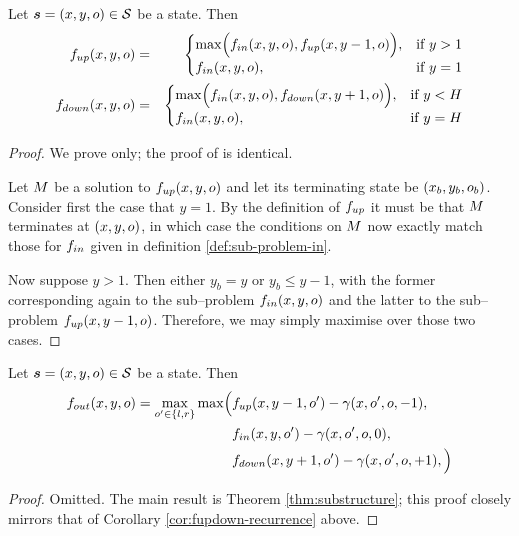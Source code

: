 \begin{corollary}
  \label{cor:fupdown-recurrence}
  Let $\State=(x,y,\WallOrient)\in\StateSpace$ be a state. Then
  \begin{eqnarray}
    \label{eq:fup-recurrence}
    \SubProbUP(x,y,\WallOrient) &=& 
    \begin{cases}
      \max \Bigl(\SubProbIN(x,y,\WallOrient),
      \SubProbUP(x,y-1,\WallOrient) \Bigr), &
      \mbox{if } y > 1 \\
      \SubProbIN(x,y,\WallOrient), & \mbox{if } y=1
    \end{cases}\\
    \label{eq:fdown-recurrence}
    \SubProbDOWN(x,y,\WallOrient) &=& 
    \begin{cases}
      \max \Bigl(\SubProbIN(x,y,\WallOrient),
      \SubProbDOWN(x,y+1,\WallOrient) \Bigr), &
      \mbox{if } y < H \\
      \SubProbIN(x,y,\WallOrient), & \mbox{if } y=H
    \end{cases}
  \end{eqnarray}
\end{corollary}
\begin{proof}
  We prove  only; the proof of
   is identical.

  Let $\Scene$ be a solution to $\SubProbUP(x,y,\WallOrient)$ and let
  its terminating state be $(x_b,y_b,\WallOrient_b)$. Consider first
  the case that $y=1$. By the definition of $\SubProbUP$ it must be
  that $\Scene$ terminates at $(x,y,\WallOrient)$, in which case the
  conditions on $\Scene$ now exactly match those for $\SubProbIN$
  given in definition \ref{def:sub-problem-in}.

  Now suppose $y>1$. Then either $y_b=y$ or $y_b \leq y-1$, with the
  former corresponding again to the sub--problem $\SubProbIN(x,y,\WallOrient)$
  and the latter to the sub--problem $\SubProbUP(x,y-1,\WallOrient)$. Therefore,
  we may simply maximise over those two cases.
\end{proof}  

\begin{corollary}
  \label{cor:fout-recurrence}
  Let $\State=(x,y,\WallOrient)\in\StateSpace$ be a state. Then
  \begin{equation}
    \begin{split}
      \label{eq:fout-recurrence}
      \SubProbOUT(x,y,\WallOrient) = 
      \max_{\WallOrient'\in\{l,r\}} \max \Bigl(
      &\SubProbUP(x,y-1,\WallOrient')
      - \CornerPenalty(x,\WallOrient',\WallOrient,-1),\\
      &\SubProbIN(x,y,\WallOrient')
      - \CornerPenalty(x,\WallOrient',\WallOrient,0),\\
      &\SubProbDOWN(x,y+1,\WallOrient')
      - \CornerPenalty(x,\WallOrient',\WallOrient,+1),
      \Bigr)
    \end{split}
  \end{equation}
\end{corollary}
\begin{proof}
  Omitted. The main result is Theorem \ref{thm:substructure}; this proof
  closely mirrors that of Corollary \ref{cor:fupdown-recurrence} above.
\end{proof}

